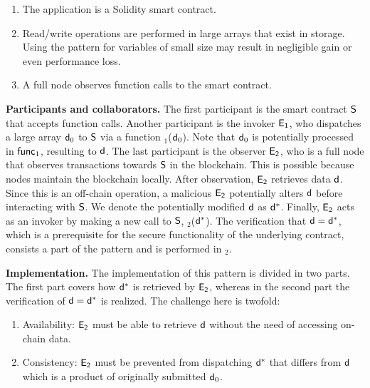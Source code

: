 \begin{enumerate}
    \item The application is a Solidity smart contract.
    \item Read/write operations are performed in large arrays that exist in
        storage. Using the pattern for variables of small size may result in
        negligible gain or even performance loss.
    \item A full node observes function calls to the smart contract.
\end{enumerate}

\noindent \textbf{Participants and collaborators.} The first participant is the
smart contract $\mathsf{S}$ that accepts function calls. Another participant is
the invoker $\mathsf{E_{1}}$, who dispatches a large array $\mathsf{d}_0$ to $\mathsf{S}$
via a function \texttt{\proc$_1$}($\mathsf{d}_0$). Note that $\mathsf{d}_0$ is
potentially processed in $\textsf{func}_1$, resulting to $\mathsf{d}$. The last participant
is the observer $\mathsf{E_{2}}$, who is a full node that observes transactions
towards $\mathsf{S}$ in the blockchain. This is possible because nodes maintain
the blockchain locally. After observation, $\mathsf{E_{2}}$ retrieves data $\mathsf{d}$.
Since this is an off-chain operation, a malicious $\mathsf{E_{2}}$ potentially
alters $\mathsf{d}$ before interacting with $\mathsf{S}$. We denote the
potentially modified $\mathsf{d}$ as $\mathsf{d^*}$. Finally, $\mathsf{E_{2}}$ acts as an
invoker by making a new call to $\mathsf{S}$, \texttt{\proc$_2$}($\mathsf{d^*}$). The
verification that $\mathsf{d} = \mathsf{d^*}$, which is a prerequisite for the secure
functionality of the underlying contract, consists a part of the pattern and is
performed in \texttt{\proc$_2$}.

\noindent \textbf{Implementation.} The implementation of this pattern is
divided in two parts. The first part covers how $\mathsf{d^*}$ is retrieved by
$\mathsf{E_{2}}$, whereas in the second part the verification of $\mathsf{d}=\mathsf{d^*}$ is
realized. The challenge here is twofold:

\begin{enumerate}

    \item Availability: $\mathsf{E_{2}}$ must be able to retrieve $\mathsf{d}$ without
        the need of accessing on-chain data.

    \item Consistency: $\mathsf{E_{2}}$ must be prevented from dispatching $\mathsf{d^*}$
        that differs from $\mathsf{d}$ which is a product of originally submitted
        $\mathsf{d}_0$.

\end{enumerate}

